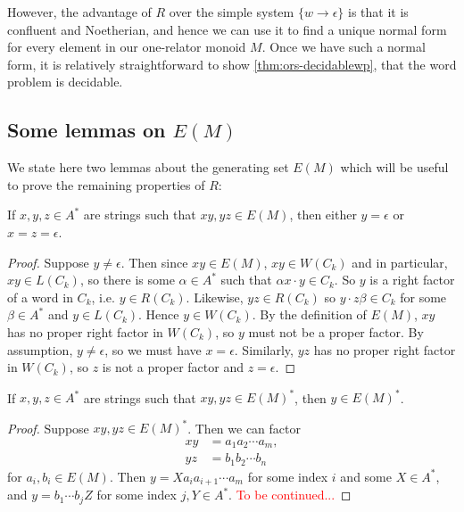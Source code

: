 \documentclass[11pt,libertine,widepage,nosubthm]{lmaths}
\begin{document}
However, the advantage of $R$ over the simple system $\{w \to \epsilon\}$ is that it is confluent and Noetherian, and hence we can use it to find a unique normal form for every element in our one-relator monoid $M$. Once we have such a normal form, it is relatively straightforward to show \cref{thm:ors-decidablewp}, that the word problem is decidable.

\subsection{Some lemmas on $E(M)$}

We state here two lemmas about the generating set $E(M)$ which will be useful to prove the remaining properties of $R$:

\begin{lemma} \label{lma:no-middle-E(M)}
	If $x, y, z \in A^*$ are strings such that $xy, yz \in E(M)$, then either $y = \epsilon$ or $x = z = \epsilon$.
\end{lemma}
\begin{proof}
	Suppose $y \ne \epsilon$. Then since $xy \in E(M)$, $xy \in W(C_k)$ and in particular, $xy \in L(C_k)$, so there is some $\alpha \in A^*$ such that $\alpha x \cdot y \in C_k$. So $y$ is a right factor of a word in $C_k$, i.e. $y \in R(C_k)$. Likewise, $yz \in R(C_k)$ so $y \cdot z\beta \in C_k$ for some $\beta \in A^*$ and $y \in L(C_k)$. Hence $y \in W(C_k)$. By the definition of $E(M)$, $xy$ has no proper right factor in $W(C_k)$, so $y$ must not be a proper factor. By assumption, $y \ne \epsilon$, so we must have $x = \epsilon$. Similarly, $yz$ has no proper right factor in $W(C_k)$, so $z$ is not a proper factor and $z = \epsilon$.
\end{proof}

\begin{cly} \label{cly:middle-E(M)*}
	If $x, y, z \in A^*$ are strings such that $xy, yz \in E(M)^*$, then $y \in E(M)^*$.
\end{cly}
\begin{proof}
	Suppose $xy, yz \in E(M)^*$. Then we can factor
		\begin{align*}
			xy &= a_1 a_2 \cdots a_m, \\
			yz &= b_1 b_2 \cdots b_n
		\end{align*}
	for $a_i, b_i \in E(M)$. Then $y = X a_i a_{i+1} \cdots a_m$ for some index $i$ and some $X \in A^*$, and $y = b_1 \cdots b_j Z$ for some index $j, Y \in A^*$. \textcolor{red}{To be continued...}
\end{proof}
\end{document}
